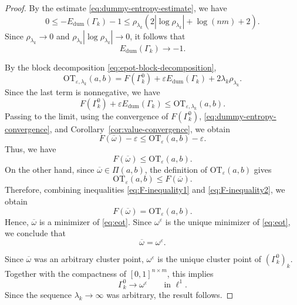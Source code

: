 \documentclass[a4paper,11pt]{article}
\numberwithin{equation}{section}
\newcommand{\eps}{\varepsilon}
\newcommand{\OT}{\mathrm{OT}}
\begin{document}
\begin{proof}
By the estimate \eqref{eq:dummy-entropy-estimate}, we have
\begin{equation*}
  0 \leq -E_{\mathrm{dum}}(\Gamma_k)-1 \leq \rho_{\lambda_k}\left(2|\log\rho_{\lambda_k}|+\log(nm)+2\right).
\end{equation*}
Since $\rho_{\lambda_k}\to0$ and $\rho_{\lambda_k}|\log\rho_{\lambda_k}|\to0$, it follows that
\begin{equation}\label{eq:dummy-entropy-convergence}
  E_{\mathrm{dum}}(\Gamma_k)\to-1.
\end{equation}

By the block decomposition \eqref{eq:epot-block-decomposition},
\begin{equation*}
  \OT_{\eps,\lambda_k}(a,b) = F(\Gamma_k^0) + \eps E_{\mathrm{dum}}(\Gamma_k) + 2\lambda_k\rho_{\lambda_k}.
\end{equation*}
Since the last term is nonnegative, we have
\begin{equation*}
  F(\Gamma_k^0)+\eps E_{\mathrm{dum}}(\Gamma_k) \leq \OT_{\eps,\lambda_k}(a,b).
\end{equation*}
Passing to the limit, using the convergence of $F(\Gamma_k^0)$, \eqref{eq:dummy-entropy-convergence}, and Corollary~\ref{cor:value-convergence}, we obtain
\begin{equation*}
  F(\overline\omega)-\eps \leq \OT_{\eps}(a,b)-\eps.
\end{equation*}
Thus, we have 
\begin{equation}\label{eq:F-inequality1}
  F(\overline\omega)\leq\OT_{\eps}(a,b).
\end{equation}
On the other hand, since $\overline\omega\in\Pi(a,b)$, the definition of $\OT_{\eps}(a,b)$ gives
\begin{equation}\label{eq:F-inequality2}
  \OT_{\eps}(a,b)\leq F(\overline\omega).
\end{equation}
Therefore, combining inequalities \eqref{eq:F-inequality1} and \eqref{eq:F-inequality2}, we obtain 
\begin{equation*}
  F(\overline\omega)=\OT_{\eps}(a,b).
\end{equation*}
Hence, $\overline\omega$ is a minimizer of \eqref{eq:eot}. Since $\omega^\eps$ is the unique minimizer of \eqref{eq:eot}, we conclude that
\begin{equation*}
  \overline\omega=\omega^\eps.
\end{equation*}

Since $\overline\omega$ was an arbitrary cluster point, $\omega^\eps$ is the unique cluster point of $(\Gamma_k^0)_k$. Together with the compactness of $[0,1]^{n\times m}$, this implies
\begin{equation*}
  \Gamma_k^0\to\omega^\eps
  \qquad\text{in }\ell^1.
\end{equation*}
Since the sequence $\lambda_k\to\infty$ was arbitrary, the result follows.
\end{proof}
\end{document}
